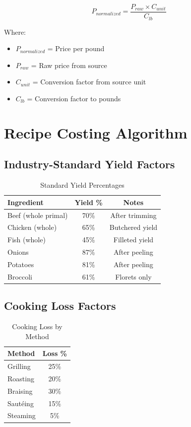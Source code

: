 \documentclass[11pt,a4paper]{article}
\begin{document}
\begin{equation}
    P_{normalized} = \frac{P_{raw} \times C_{unit}}{C_{lb}}
\end{equation}

Where:
\begin{itemize}
    \item $P_{normalized}$ = Price per pound
    \item $P_{raw}$ = Raw price from source
    \item $C_{unit}$ = Conversion factor from source unit
    \item $C_{lb}$ = Conversion factor to pounds
\end{itemize}

\section{Recipe Costing Algorithm}

\subsection{Industry-Standard Yield Factors}

\begin{table}[h]
\centering
\begin{tabular}{@{}lcc@{}}
\toprule
\textbf{Ingredient} & \textbf{Yield \%} & \textbf{Notes} \\
\midrule
Beef (whole primal) & 70\% & After trimming \\
Chicken (whole) & 65\% & Butchered yield \\
Fish (whole) & 45\% & Filleted yield \\
Onions & 87\% & After peeling \\
Potatoes & 81\% & After peeling \\
Broccoli & 61\% & Florets only \\
\bottomrule
\end{tabular}
\caption{Standard Yield Percentages}
\end{table}

\subsection{Cooking Loss Factors}

\begin{table}[h]
\centering
\begin{tabular}{@{}lc@{}}
\toprule
\textbf{Method} & \textbf{Loss \%} \\
\midrule
Grilling & 25\% \\
Roasting & 20\% \\
Braising & 30\% \\
Sautéing & 15\% \\
Steaming & 5\% \\
\bottomrule
\end{tabular}
\caption{Cooking Loss by Method}
\end{table}
\end{document}
